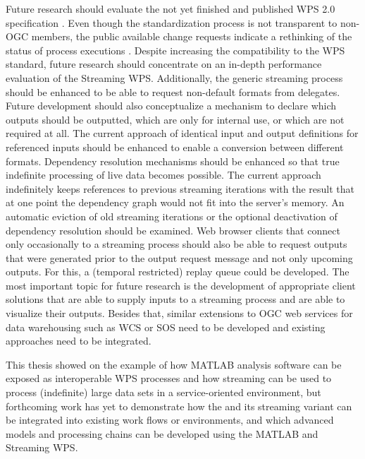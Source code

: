Future research should evaluate the not yet finished and published WPS 2.0 specification \citep{ogc:wps2swg}. Even though the standardization process is not transparent to non-OGC members, the public available change requests indicate a rethinking of the status of process executions \citep[e.g.][]{ogc:wps:cr109}. Despite increasing the compatibility to the WPS standard, future research should concentrate on an in-depth performance evaluation of the Streaming WPS. Additionally, the generic streaming process should be enhanced to be able to request non-default formats from delegates. Future development should also conceptualize a mechanism to declare which outputs should be outputted, which are only for internal use, or which are not required at all. The current approach of identical input and output definitions for referenced inputs should be enhanced to enable a conversion between different formats. Dependency resolution mechanisms should be enhanced so that true indefinite processing of live data becomes possible. The current approach indefinitely keeps references to previous streaming iterations with the result that at one point the dependency graph would not fit into the server's memory. An automatic eviction of old streaming iterations or the optional deactivation of dependency resolution should be examined. Web browser clients that connect only occasionally to a streaming process should also be able to request outputs that were generated prior to the output request message and not only upcoming outputs. For this, a (temporal restricted) replay queue could be developed. The most important topic for future research is the development of appropriate client solutions that are able to supply inputs to a streaming process and are able to visualize their outputs. Besides that, similar extensions to OGC web services for data warehousing such as \ac{WCS} or \ac{SOS} need to be developed and existing approaches \citep[e.g. for the \ac{WFS}, see ][]{aydin2006streaming} need to be integrated.

This thesis showed on the example of \la how MATLAB analysis software can be exposed as interoperable WPS processes and how streaming can be used to process (indefinite) large data sets in a service-oriented environment, but forthcoming work has yet to demonstrate how the \la and its streaming variant can be integrated into existing work flows or environments, and which advanced models and processing chains can be developed using the MATLAB and Streaming WPS.
